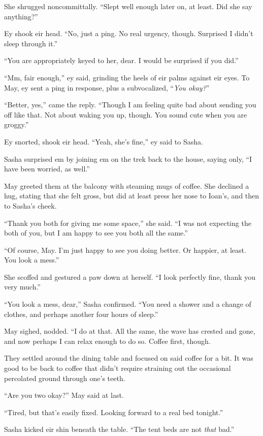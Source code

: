 She shrugged noncommittally. ``Slept well enough later on, at least. Did she say anything?''

Ey shook eir head. ``No, just a ping. No real urgency, though. Surprised I didn't sleep through it.''

``You are appropriately keyed to her, dear. I would be surprised if you did.''

``Mm, fair enough,'' ey said, grinding the heels of eir palms against eir eyes. To May, ey sent a ping in response, plus a subvocalized, ``\emph{You okay?}''

``Better, yes,'' came the reply. ``Though I am feeling quite bad about sending you off like that. Not about waking you up, though. You sound cute when you are groggy.''

Ey snorted, shook eir head. ``Yeah, she's fine,'' ey said to Sasha.

Sasha surprised em by joining em on the trek back to the house, saying only, ``I have been worried, as well.''

May greeted them at the balcony with steaming mugs of coffee. She declined a hug, stating that she felt gross, but did at least press her nose to Ioan's, and then to Sasha's cheek.

``Thank you both for giving me some space,'' she said. ``I was not expecting the both of you, but I am happy to see you both all the same.''

``Of course, May. I'm just happy to see you doing better. Or happier, at least. You look a mess.''

She scoffed and gestured a paw down at herself. ``I look perfectly fine, thank you very much.''

``You look a mess, dear,'' Sasha confirmed. ``You need a shower and a change of clothes, and perhaps another four hours of sleep.''

May sighed, nodded. ``I do at that. All the same, the wave has crested and gone, and now perhaps I can relax enough to do so. Coffee first, though.

They settled around the dining table and focused on said coffee for a bit. It was good to be back to coffee that didn't require straining out the occasional percolated ground through one's teeth.

``Are you two okay?'' May said at last.

``Tired, but that's easily fixed. Looking forward to a real bed tonight.''

Sasha kicked eir shin beneath the table. ``The tent beds are not \emph{that} bad.''

